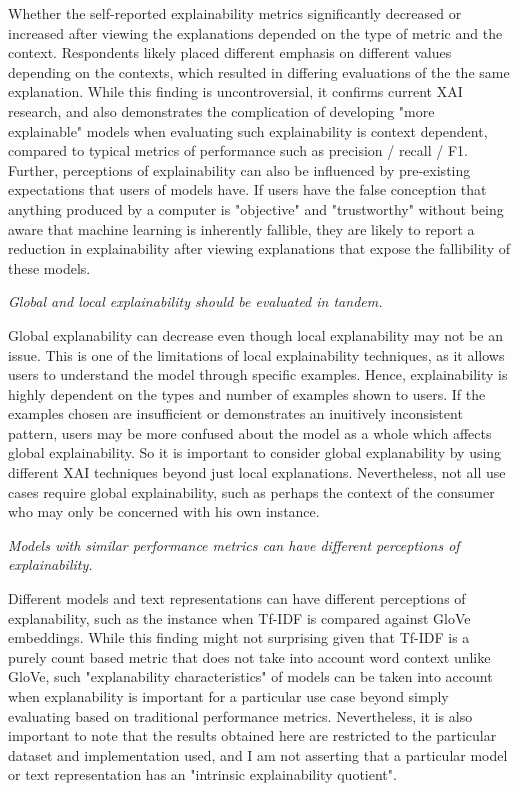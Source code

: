 Whether the self-reported explainability metrics significantly decreased or increased after viewing the explanations depended on the type of metric and the context. Respondents likely placed different emphasis on different values depending on the contexts, which resulted in differing evaluations of the the same explanation. While this finding is uncontroversial, it confirms current XAI research, and also demonstrates the complication of developing "more explainable" models when evaluating such explainability is context dependent, compared to typical metrics of performance such as precision / recall / F1. Further, perceptions of explainability can also be influenced by pre-existing expectations that users of models have. If users have the false conception that anything produced by a computer is "objective" and "trustworthy" without being aware that machine learning is inherently fallible, they are likely to report a reduction in explainability after viewing explanations that expose the fallibility of these models.

\textit{Global and local explainability should be evaluated in tandem.}

Global explanability can decrease even though local explanability may not be an issue. This is one of the limitations of local explainability techniques, as it allows users to understand the model through specific examples. Hence, explainability is highly dependent on the types and number of examples shown to users. If the examples chosen are insufficient or demonstrates an inuitively inconsistent pattern, users may be more confused about the model as a whole which affects global explainability. So it is important to consider global explanability by using different XAI techniques beyond just local explanations. Nevertheless, not all use cases require global explainability, such as perhaps the context of the consumer who may only be concerned with his own instance.

\textit{Models with similar performance metrics can have different perceptions of explainability.}

Different models and text representations can have different perceptions of explanability, such as the instance when Tf-IDF is compared against GloVe embeddings. While this finding might not surprising given that Tf-IDF is a purely count based metric that does not take into account word context unlike GloVe, such "explanability characteristics" of models can be taken into account when explanability is important for a particular use case beyond simply evaluating based on traditional performance metrics. Nevertheless, it is also important to note that the results obtained here are restricted to the particular dataset and implementation used, and I am not asserting that a particular model or text representation has an "intrinsic explainability quotient". 